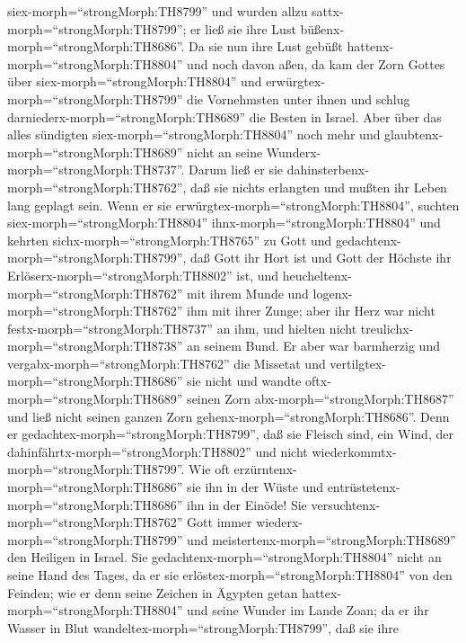 siex-morph=``strongMorph:TH8799'' und wurden allzu
sattx-morph=``strongMorph:TH8799''; er ließ sie ihre Lust
büßenx-morph=``strongMorph:TH8686''.  Da sie nun ihre Lust
gebüßt hattenx-morph=``strongMorph:TH8804'' und noch davon aßen,
 da kam der Zorn Gottes über
siex-morph=``strongMorph:TH8804'' und
erwürgtex-morph=``strongMorph:TH8799'' die Vornehmsten unter ihnen und
schlug darniederx-morph=``strongMorph:TH8689'' die Besten in Israel.
 Aber über das alles sündigten
siex-morph=``strongMorph:TH8804'' noch mehr und
glaubtenx-morph=``strongMorph:TH8689'' nicht an seine
Wunderx-morph=``strongMorph:TH8737''.  Darum ließ er sie
dahinsterbenx-morph=``strongMorph:TH8762'', daß sie nichts erlangten und
mußten ihr Leben lang geplagt sein.  Wenn er sie
erwürgtex-morph=``strongMorph:TH8804'', suchten
siex-morph=``strongMorph:TH8804'' ihnx-morph=``strongMorph:TH8804'' und
kehrten sichx-morph=``strongMorph:TH8765'' zu Gott  und
gedachtenx-morph=``strongMorph:TH8799'', daß Gott ihr Hort ist und Gott
der Höchste ihr Erlöserx-morph=``strongMorph:TH8802'' ist, 
und heucheltenx-morph=``strongMorph:TH8762'' mit ihrem Munde und
logenx-morph=``strongMorph:TH8762'' ihm mit ihrer Zunge; 
aber ihr Herz war nicht festx-morph=``strongMorph:TH8737'' an ihm, und
hielten nicht treulichx-morph=``strongMorph:TH8738'' an seinem Bund.
 Er aber war barmherzig und
vergabx-morph=``strongMorph:TH8762'' die Missetat und
vertilgtex-morph=``strongMorph:TH8686'' sie nicht und wandte
oftx-morph=``strongMorph:TH8689'' seinen Zorn
abx-morph=``strongMorph:TH8687'' und ließ nicht seinen ganzen Zorn
gehenx-morph=``strongMorph:TH8686''.  Denn er
gedachtex-morph=``strongMorph:TH8799'', daß sie Fleisch sind, ein Wind,
der dahinfährtx-morph=``strongMorph:TH8802'' und nicht
wiederkommtx-morph=``strongMorph:TH8799''.  Wie oft
erzürntenx-morph=``strongMorph:TH8686'' sie ihn in der Wüste und
entrüstetenx-morph=``strongMorph:TH8686'' ihn in der Einöde!
 Sie versuchtenx-morph=``strongMorph:TH8762'' Gott immer
wiederx-morph=``strongMorph:TH8799'' und
meistertenx-morph=``strongMorph:TH8689'' den Heiligen in Israel.
 Sie gedachtenx-morph=``strongMorph:TH8804'' nicht an seine
Hand des Tages, da er sie erlöstex-morph=``strongMorph:TH8804'' von den
Feinden;  wie er denn seine Zeichen in Ägypten getan
hattex-morph=``strongMorph:TH8804'' und seine Wunder im Lande Zoan;
 da er ihr Wasser in Blut
wandeltex-morph=``strongMorph:TH8799'', daß sie ihre
